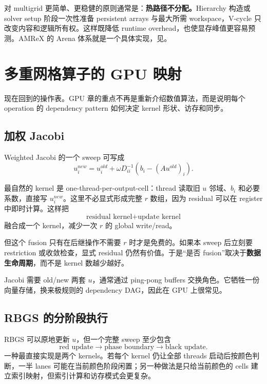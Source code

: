 对 multigrid 更简单、更稳健的原则通常是：\textbf{热路径不分配。}Hierarchy 构造或 solver setup 阶段一次性准备 persistent arrays 与最大所需 workspace，V-cycle 只改变内容和逻辑所有权。这样既降低 runtime overhead，也使显存峰值更容易预测。AMReX 的 Arena 体系就是一个具体实现，见。

\section{多重网格算子的 GPU 映射}
\label{sec:gpu-mg-operators}

现在回到的操作表。GPU 章的重点不再是重新介绍数值算法，而是说明每个 operation 的 dependency pattern 如何决定 kernel 形状、访存和同步。

\subsection{加权 Jacobi}

Weighted Jacobi 的一个 sweep 可写成
\begin{equation}
u_i^{new}=u_i^{old}+\omega D_{ii}^{-1}
\left(b_i-(Au^{old})_i\right).
\label{eq:gpu-jacobi-fused}
\end{equation}

最自然的 kernel 是 one-thread-per-output-cell：thread 读取旧 $u$ 邻域、$b_i$ 和必要系数，直接写 $u_i^{new}$。这里不必显式形成完整 $r$ 数组，因为 residual 可以在 register 中即时计算。这样把
\[
\text{residual kernel}+\text{update kernel}
\]
融合成一个 kernel，减少一次 $r$ 的 global write/read。

但这个 fusion 只有在后继操作不需要 $r$ 时才是免费的。如果本 sweep 后立刻要 restriction 或收敛检查，显式 residual 仍然有价值。于是“是否 fusion”取决于\textbf{数据生命周期}，而不是 kernel 数越少越好。

Jacobi 需要 old/new 两套 $u$，通常通过 ping-pong buffers 交换角色。它牺牲一份向量存储，换来极规则的 dependency DAG，因此在 GPU 上很常见。

\subsection{RBGS 的分阶段执行}

RBGS 可以原地更新 $u$，但一个完整 sweep 至少包含
\[
\text{red update}
\rightarrow
\text{phase boundary}
\rightarrow
\text{black update}.
\]
一种最直接实现是两个 kernels。若每个 kernel 仍让全部 threads 启动后按颜色判断，一半 lanes 可能在当前颜色阶段闲置；另一种做法是只给当前颜色的 cells 建立索引映射，但索引计算和访存模式会更复杂。

